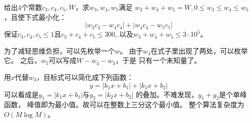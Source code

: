 \begin{prob}
	给出4个常数$c_3, c_4, c_5, W$，求$w_3, w_4, w_5$满足
	$w_3+w_4+w_5 = W, 0 \le w_3 \le w_4 \le w_5$
	，且使下式最小化：
	\begin{displaymath}
		|w_3 c_3 - w_4c_4| + |w_4 c_4 - w_5 c_5|
	\end{displaymath}
	保证$c_3,c_4,c_5 \le 1$且$c_3 + c_4 + c_5 \le 300$,
	以及$w_3 + w_4 + w_5 \le 3 \cdot 10^5$。
\end{prob}

\begin{sol}
	为了减轻思维负担，可以先枚举一个$w$。
	由于$w_4$在式子里出现了两处，可以枚举它。
	之后，$w_5$可以写成$W - w_4 - w_3$，于是
	只有一个未知量了。\par
	用$x$代替$w_3$，目标式可以简化成下列函数：
	\begin{displaymath}
		y = |k_1 x + b_1| + |k_2 x + b_2|
	\end{displaymath}
	可以看成是$y_1 = |k_1 x + b_1|$与$y_2 = |k_2 x + b_2|$
	的叠加。不难发现，$y_1 + y_2$是个单峰函数，
	峰值即为最小值。故可以在整数上三分这个最小值。
	整个算法复杂度为$O(M \log M)$。
\end{sol}
